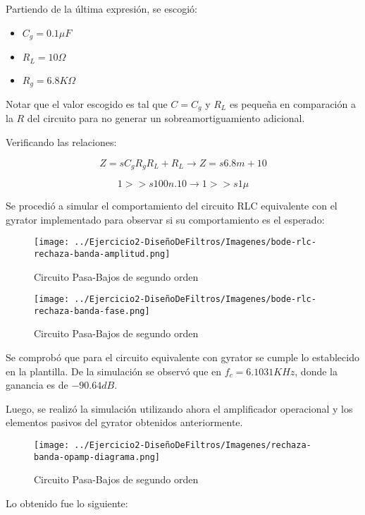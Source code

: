 Partiendo de la última expresión, se escogió:

\begin{itemize}
	\item $C_g=0.1 \mu F$
	\item $R_L=10 \Omega$
	\item $R_g=6.8K \Omega$
\end{itemize}

Notar que el valor escogido es tal que $C=C_g$ y $R_L$ es pequeña en comparación a la $R$ del circuito para no generar
un sobreamortiguamiento adicional.

Verificando las relaciones:

$$Z=sC_gR_gR_L+R_L \longrightarrow Z = s6.8m + 10$$

$$1 >> s100n.10 \longrightarrow 1  >> s1\mu$$

Se procedió a simular el comportamiento del circuito RLC equivalente con el gyrator implementado para observar si su comportamiento es el esperado:


\begin{figure}[H]
    \centering
    \texttt{[image: ../Ejercicio2-DiseñoDeFiltros/Imagenes/bode-rlc-rechaza-banda-amplitud.png]}
    \caption{Circuito Pasa-Bajos de segundo orden}
\end{figure}

\begin{figure}[H]
    \centering
    \texttt{[image: ../Ejercicio2-DiseñoDeFiltros/Imagenes/bode-rlc-rechaza-banda-fase.png]}
    \caption{Circuito Pasa-Bajos de segundo orden}
\end{figure}

Se comprobó que para el circuito equivalente con gyrator se cumple lo establecido en la plantilla.
De la simulación se observó que en $f_c=6.1031 KHz$, donde la ganancia es de $-90.64 dB$.

Luego, se realizó la simulación utilizando ahora el amplificador operacional y los elementos pasivos del gyrator obtenidos anteriormente.

\begin{figure}[H]
    \centering
    \texttt{[image: ../Ejercicio2-DiseñoDeFiltros/Imagenes/rechaza-banda-opamp-diagrama.png]}
    \caption{Circuito Pasa-Bajos de segundo orden}
\end{figure}

Lo obtenido fue lo siguiente:

